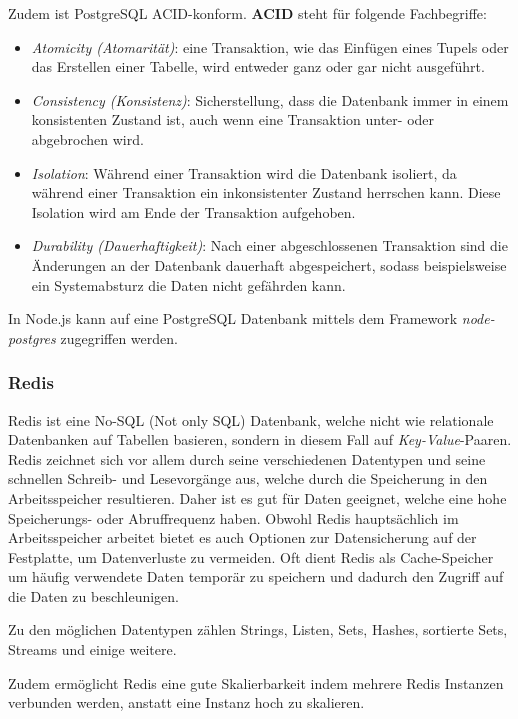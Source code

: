 \documentclass[a4paper,12pt]{report}
\newcommand{\footcite}[1]{\footnotemark\footnotetext{\cite{#1}}}
\begin{document}
Zudem ist PostgreSQL ACID-konform. \textbf{ACID} steht für folgende Fachbegriffe\footcite{sql-book}:
\begin{itemize}
 \item \textit{Atomicity (Atomarität)}: eine Transaktion, wie das Einfügen eines Tupels oder das Erstellen einer Tabelle, wird entweder ganz oder gar nicht ausgeführt.
 \item \textit{Consistency (Konsistenz)}: Sicherstellung, dass die Datenbank immer in einem konsistenten Zustand ist, auch wenn eine Transaktion unter- oder abgebrochen wird.
 \item \textit{Isolation}: Während einer Transaktion wird die Datenbank isoliert, da während einer Transaktion ein inkonsistenter Zustand herrschen kann. Diese Isolation wird am Ende der Transaktion aufgehoben.
  \item \textit{Durability (Dauerhaftigkeit)}: Nach einer abgeschlossenen Transaktion sind die Änderungen an der Datenbank dauerhaft abgespeichert, sodass beispielsweise ein Systemabsturz die Daten nicht gefährden kann.
\end{itemize}

In Node.js kann auf eine PostgreSQL Datenbank mittels dem Framework \textit{node-postgres} zugegriffen werden\footcite{node-postgres}.
        \subsubsection{Redis}
Redis ist eine No-SQL (Not only SQL) Datenbank, welche nicht wie relationale Datenbanken auf Tabellen basieren, sondern in diesem Fall auf \textit{Key-Value}-Paaren. Redis zeichnet sich vor allem durch seine verschiedenen Datentypen und seine schnellen Schreib- und Lesevorgänge aus, welche durch die Speicherung in den Arbeitsspeicher resultieren\footcite{redis-book}. Daher ist es gut für Daten geeignet, welche eine hohe Speicherungs- oder Abruffrequenz haben. Obwohl Redis hauptsächlich im Arbeitsspeicher arbeitet bietet es auch Optionen zur Datensicherung auf der Festplatte, um Datenverluste zu vermeiden. Oft dient Redis als Cache-Speicher um häufig verwendete Daten temporär zu speichern und dadurch den Zugriff auf die Daten zu beschleunigen\footcite{redis}. 

Zu den möglichen Datentypen zählen Strings, Listen, Sets, Hashes, sortierte Sets, Streams und einige weitere\footcite{redis}. 	

 Zudem ermöglicht Redis eine gute Skalierbarkeit indem mehrere Redis Instanzen verbunden werden, anstatt eine Instanz hoch zu skalieren.
       
\end{document}
